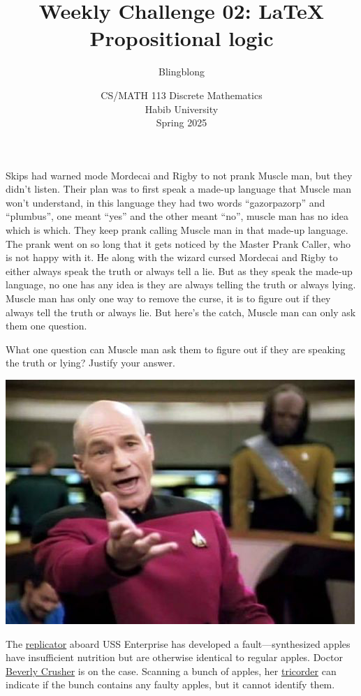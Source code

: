 \documentclass[a4paper]{exam}
\title{Weekly Challenge 02: \LaTeX\; Propositional logic}
\author{Blingblong} %
\date{CS/MATH 113 Discrete Mathematics\\Habib University\\Spring 2025}
\begin{document}
\maketitle

\begin{questions}
  
Skips had warned mode Mordecai and Rigby to not prank Muscle man, but they didn't listen.
Their plan was to first speak a made-up language that Muscle man won't understand, in this language they had two words ``gazorpazorp'' and ``plumbus'', one meant ``yes'' and the other meant ``no'', muscle man has no idea which is which. They keep prank calling Muscle man in that made-up language.
The prank went on so long that it gets noticed by the Master Prank Caller, who is not happy with it. He along with the wizard cursed Mordecai and Rigby to either always speak the truth or always tell a lie. But as they speak the made-up language, no one has any idea is they are always telling the truth or always lying. Muscle man has only one way to remove the curse, it is to figure out if they always tell the truth or always lie. But here's the catch, Muscle man can only ask them one question. 

What one question can Muscle man ask them to figure out if they are speaking the truth or lying? Justify your answer.
\begin{solution}
\end{solution}

  \begin{minipage}{.3\linewidth}
  \centerline{\includegraphics[width=\textwidth]{picard}}
\end{minipage}
\begin{minipage}{.65\linewidth}
  The \href{https://en.wikipedia.org/wiki/Replicator_(Star_Trek)}{replicator} aboard USS Enterprise has developed a fault---synthesized apples have insufficient nutrition but are otherwise identical to regular apples. Doctor \href{https://memory-alpha.fandom.com/wiki/Beverly_Crusher}{Beverly Crusher} is on the case. Scanning a bunch of apples, her \href{https://en.wikipedia.org/wiki/Medical_tricorder}{tricorder} can indicate if the bunch contains any faulty apples, but it cannot identify them.
\end{minipage}


\end{questions}
\end{document}
